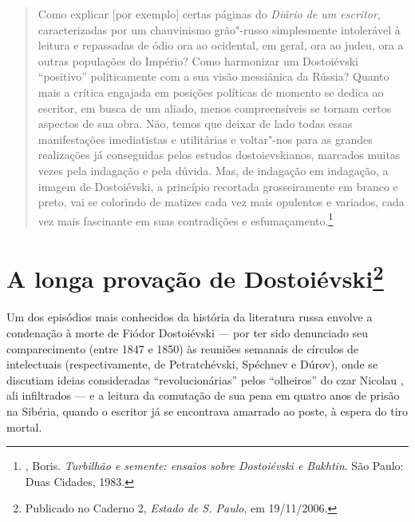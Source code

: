 \begin{quotation}
Como explicar [por exemplo] certas páginas do \emph{Diário de um escritor}, caracterizadas por um chauvinismo grão"-russo simplesmente intolerável à leitura e repassadas de ódio ora ao ocidental, em geral, ora ao judeu, ora a outras populações do Império? Como harmonizar um Dostoiévski ``positivo'' politicamente com a sua visão messiânica da Rússia? Quanto mais a crítica engajada em posições políticas de momento se dedica ao escritor, em busca de um aliado, menos compreensíveis se tornam certos aspectos de sua obra. Não, temos que deixar de lado todas essas manifestações imediatistas e utilitárias e voltar"-nos para as grandes realizações já conseguidas pelos estudos dostoievskianos, marcados muitas vezes pela indagação e pela dúvida. Mas, de indagação em indagação, a imagem de Dostoiévski, a princípio recortada grosseiramente em branco e preto, vai se colorindo de matizes cada vez mais opulentos e variados, cada vez mais fascinante em suas contradições e esfumaçamento.\footnote{, Boris. \emph{Turbilhão e semente: ensaios sobre Dostoiévski e Bakhtin}. São Paulo: Duas Cidades, 1983.}
\end{quotation}



\chapter*{A longa provação de Dostoiévski\footnote{Publicado no Caderno 2, \emph{Estado de S. Paulo}, em 19/11/2006.}}

\label{longaprovacao}

Um dos episódios mais conhecidos da história da literatura russa envolve a
condenação à morte de Fiódor Dostoiévski --- por ter sido
denunciado seu comparecimento (entre 1847 e 1850) às reuniões
semanais de círculos de intelectuais (respectivamente, de
Petratchévski, Spéchnev e Dúrov), onde se discutiam ideias
consideradas ``revolucionárias'' pelos ``olheiros'' do czar
Nicolau , ali infiltrados --- e a leitura da
comutação de sua pena em quatro anos de prisão na Sibéria,
quando o escritor já se encontrava amarrado ao poste,
à espera do tiro mortal.

